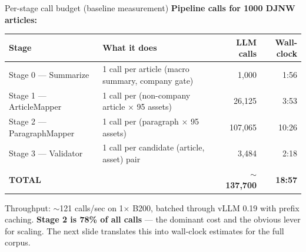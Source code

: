 \documentclass[10pt,aspectratio=169]{beamer}
\begin{document}
\begin{frame}{Per-stage call budget (baseline measurement)}
  \scriptsize
  \textbf{Pipeline calls for 1000 DJNW articles:}

  \vspace{0.3em}
  \centering
  \setlength{\tabcolsep}{8pt}
  \renewcommand{\arraystretch}{1.2}
  \begin{tabular}{llrr}
    \toprule
    \textbf{Stage} & \textbf{What it does} & \textbf{LLM calls} & \textbf{Wall-clock} \\
    \midrule
    Stage 0 --- Summarize & 1 call per article (macro summary, company gate) & 1{,}000 & 1:56 \\
    Stage 1 --- ArticleMapper & 1 call per (non-company article $\times$ 95 assets) & 26{,}125 & 3:53 \\
    Stage 2 --- ParagraphMapper & 1 call per (paragraph $\times$ 95 assets) & 107{,}065 & 10:26 \\
    Stage 3 --- Validator & 1 call per candidate (article, asset) pair & 3{,}484 & 2:18 \\
    \midrule
    \textbf{TOTAL}         &  & \textbf{$\sim$137{,}700} & \textbf{18:57} \\
    \bottomrule
  \end{tabular}

  \vspace{0.4em}
  \raggedright
  Throughput: $\sim$121 calls/sec on 1$\times$ B200, batched through vLLM 0.19 with prefix
  caching. \textbf{Stage 2 is 78\% of all calls} --- the dominant cost and the obvious lever
  for scaling. The next slide translates this into wall-clock estimates for the full corpus.
\end{frame}
\end{document}
